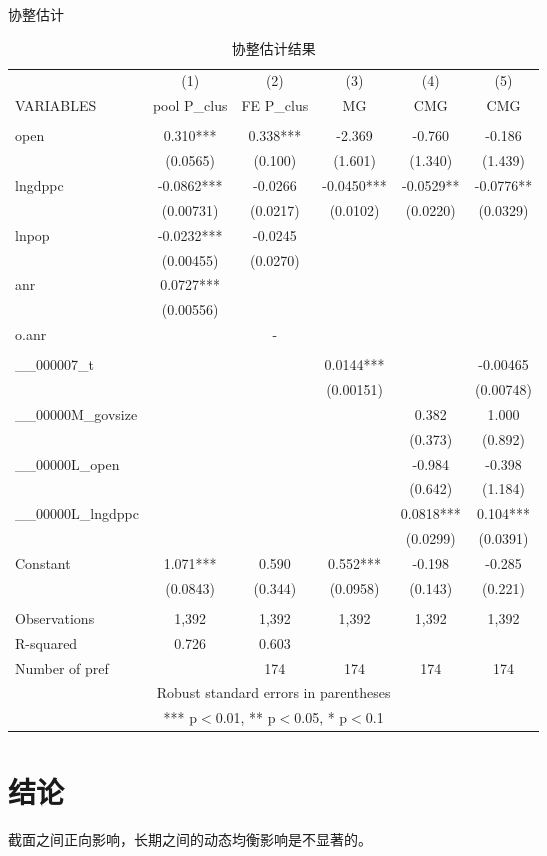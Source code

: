 \documentclass[10pt]{article}
\begin{document}
    \begin{table}
        \begin{center}
        \caption{协整估计}
            \caption{协整估计结果}
            \begin{tabular}{lccccc} \hline \hline
             & (1) & (2) & (3) & (4) & (5) \\
            VARIABLES & pool P\_clus & FE P\_clus & MG & CMG & CMG \\ \hline
             &  &  &  &  &  \\
            open & 0.310*** & 0.338*** & -2.369 & -0.760 & -0.186 \\
             & (0.0565) & (0.100) & (1.601) & (1.340) & (1.439) \\
            lngdppc & -0.0862*** & -0.0266 & -0.0450*** & -0.0529** & -0.0776** \\
             & (0.00731) & (0.0217) & (0.0102) & (0.0220) & (0.0329) \\
            lnpop & -0.0232*** & -0.0245 &  &  &  \\
             & (0.00455) & (0.0270) &  &  &  \\
            anr & 0.0727*** &  &  &  &  \\
             & (0.00556) &  &  &  &  \\
            o.anr &  & - &  &  &  \\
             &  &  &  &  &  \\
            \_\_000007\_t &  &  & 0.0144*** &  & -0.00465 \\
             &  &  & (0.00151) &  & (0.00748) \\
            \_\_00000M\_govsize &  &  &  & 0.382 & 1.000 \\
             &  &  &  & (0.373) & (0.892) \\
            \_\_00000L\_open &  &  &  & -0.984 & -0.398 \\
             &  &  &  & (0.642) & (1.184) \\
            \_\_00000L\_lngdppc &  &  &  & 0.0818*** & 0.104*** \\
             &  &  &  & (0.0299) & (0.0391) \\
            Constant & 1.071*** & 0.590 & 0.552*** & -0.198 & -0.285 \\
             & (0.0843) & (0.344) & (0.0958) & (0.143) & (0.221) \\
             &  &  &  &  &  \\
            Observations & 1,392 & 1,392 & 1,392 & 1,392 & 1,392 \\
            R-squared & 0.726 & 0.603 &  &  &  \\
             Number of pref &  & 174 & 174 & 174 & 174 \\ \hline \hline
            \multicolumn{6}{c}{ Robust standard errors in parentheses} \\
            \multicolumn{6}{c}{ *** p$<$0.01, ** p$<$0.05, * p$<$0.1} \\
        \end{tabular}
        \end{center}
    \end{table}


\section{结论}
截面之间正向影响，长期之间的动态均衡影响是不显著的。

\renewcommand\refname{参考文献}
%

\end{document}
